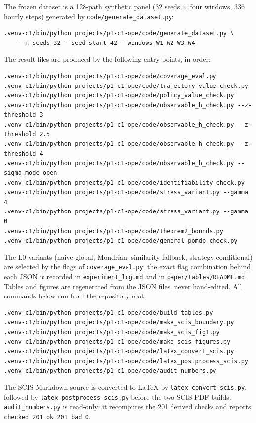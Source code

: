 The frozen dataset is a 128-path synthetic panel (32 seeds $\times$ four
windows, 336 hourly steps) generated by
\texttt{code/generate\_dataset.py}:
\begin{verbatim}
.venv-c1/bin/python projects/p1-c1-ope/code/generate_dataset.py \
    --n-seeds 32 --seed-start 42 --windows W1 W2 W3 W4
\end{verbatim}
The result files are produced by the following entry points, in order:
\begin{verbatim}
.venv-c1/bin/python projects/p1-c1-ope/code/coverage_eval.py
.venv-c1/bin/python projects/p1-c1-ope/code/trajectory_value_check.py
.venv-c1/bin/python projects/p1-c1-ope/code/policy_value_check.py
.venv-c1/bin/python projects/p1-c1-ope/code/observable_h_check.py --z-threshold 3
.venv-c1/bin/python projects/p1-c1-ope/code/observable_h_check.py --z-threshold 2.5
.venv-c1/bin/python projects/p1-c1-ope/code/observable_h_check.py --z-threshold 4
.venv-c1/bin/python projects/p1-c1-ope/code/observable_h_check.py --sigma-mode open
.venv-c1/bin/python projects/p1-c1-ope/code/identifiability_check.py
.venv-c1/bin/python projects/p1-c1-ope/code/stress_variant.py --gamma 4
.venv-c1/bin/python projects/p1-c1-ope/code/stress_variant.py --gamma 0
.venv-c1/bin/python projects/p1-c1-ope/code/theorem2_bounds.py
.venv-c1/bin/python projects/p1-c1-ope/code/general_pomdp_check.py
\end{verbatim}
The L0 variants (naive global, Mondrian, similarity fallback,
strategy-conditional) are selected by the flags of
\texttt{coverage\_eval.py}; the exact flag combination behind each JSON is
recorded in \texttt{experiment\_log.md} and in
\texttt{paper/tables/README.md}. Tables and figures are regenerated from
the JSON files, never hand-edited. All commands below run from the repository root:
\begin{verbatim}
.venv-c1/bin/python projects/p1-c1-ope/code/build_tables.py
.venv-c1/bin/python projects/p1-c1-ope/code/make_scis_boundary.py
.venv-c1/bin/python projects/p1-c1-ope/code/make_scis_fig1.py
.venv-c1/bin/python projects/p1-c1-ope/code/make_scis_figures.py
.venv-c1/bin/python projects/p1-c1-ope/code/latex_convert_scis.py
.venv-c1/bin/python projects/p1-c1-ope/code/latex_postprocess_scis.py
.venv-c1/bin/python projects/p1-c1-ope/code/audit_numbers.py
\end{verbatim}
The SCIS Markdown source is converted to LaTeX by \texttt{latex\_convert\_scis.py},
followed by \texttt{latex\_postprocess\_scis.py} before the two SCIS PDF builds.
\texttt{audit\_numbers.py} is read-only: it recomputes the 201 derived checks and
reports \texttt{checked 201 ok 201 bad 0}.

